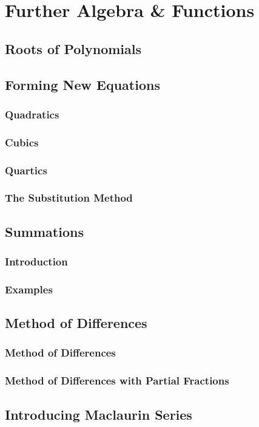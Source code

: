 \documentclass[../maths.tex]{subfiles}
\begin{document}
\chapter{Further Algebra \& Functions}
\section{Roots of Polynomials}
\section{Forming New Equations}
\subsection*{Quadratics}
\subsection*{Cubics}
\subsection*{Quartics}
\subsection*{The Substitution Method}
\section{Summations}
\subsection*{Introduction}
\subsection*{Examples}
\section{Method of Differences}
\subsection*{Method of Differences}
\subsection*{Method of Differences with Partial Fractions}
\section{Introducing Maclaurin Series}
\end{document}
